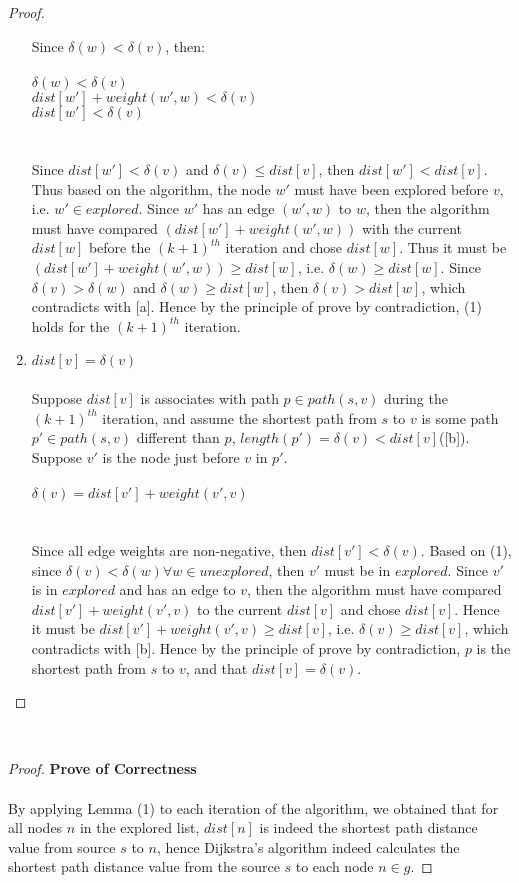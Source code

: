 \documentclass[11pt, oneside]{article}   	%
\newcommand\tab[1][1cm]{\hspace*{#1}}
\newcommand\ftab[1][5cm]{\hspace*{#1}}
\theoremstyle{definition}
\begin{document}
\begin{proof}
\begin{enumerate}
Since $\delta(w) < \delta(v)$, then: 
\\\\
\ftab $\delta(w) < \delta(v)$ \\
\ftab $dist[w'] + weight(w', w) < \delta(v)$ \\
\ftab $dist[w'] < \delta(v)$ \\
\\\\
Since $dist[w'] < \delta(v)$ and $\delta(v) \leq dist[v]$, then $dist[w'] < dist[v]$. Thus based on the algorithm, the node $w'$ must have been explored before $v$, i.e. $w' \in explored$. Since $w'$ has an edge $(w', w)$ to $w$, then the algorithm must have compared $(dist[w'] + weight(w', w))$ with the current $dist[w]$ before the $(k+1)^{th}$ iteration and chose $dist[w]$. Thus it must be $(dist[w'] + weight(w', w)) \geq dist[w]$, i.e. $\delta(w) \geq dist[w]$. Since $\delta(v) > \delta(w)$ and $\delta(w) \geq dist[w]$, then $\delta(v) > dist[w]$, which contradicts with [a]. Hence by the principle of prove by contradiction, (1) holds for the $(k+1)^{th}$ iteration. 
\\
\item $dist[v] = \delta(v)$
\\\\
Suppose $dist[v]$ is associates with path $p \in path(s, v)$ during the $(k+1)^{th}$ iteration, and assume the shortest path from $s$ to $v$ is some path $p' \in path(s, v)$ different than $p$, $length(p') = \delta(v) < dist[v]$([b]). Suppose $v'$ is the node just before $v$ in $p'$. 
\\\\
\ftab $\delta(v) = dist[v'] + weight(v', v)$ \\
\\\\
Since all edge weights are non-negative, then $dist[v'] < \delta(v)$. Based on (1), since $\delta(v) < \delta(w) \forall w \in unexplored$, then $v'$ must be in $explored$. Since $v'$ is in $explored$ and has an edge to $v$, then the algorithm must have compared $dist[v'] + weight(v', v)$ to the current $dist[v]$ and chose $dist[v]$. Hence it must be $dist[v'] + weight(v', v) \geq dist[v]$, i.e. $\delta(v) \geq dist[v]$, which contradicts with [b]. Hence by the principle of prove by contradiction, $p$ is the shortest path from $s$ to $v$, and that $dist[v] = \delta(v)$. 
\end{enumerate}
\end{proof}
\tab\\
\begin{proof}\textbf{Prove of Correctness}
\\\\
By applying Lemma (1) to each iteration of the algorithm, we obtained that for all nodes $n$ in the explored list, $dist[n]$ is indeed the shortest path distance value from source $s$ to $n$, hence Dijkstra's algorithm indeed calculates the shortest path distance value from the source $s$ to each node $n \in g$. 
\end{proof}
\end{document}
